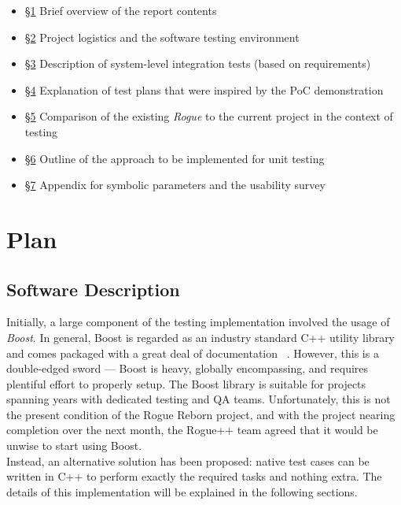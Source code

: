 \documentclass[12pt, titlepage]{article}
\begin{document}
		\begin{itemize}
			\item [] \hyperref[section1]{\S 1} Brief overview of the report contents
			\item [] \hyperref[section2]{\S 2} Project logistics and the software testing environment
			\item [] \hyperref[section3]{\S 3} Description of system-level integration tests (based on requirements)
			\item [] \hyperref[section4]{\S 4} Explanation of test plans that were inspired by the PoC demonstration
			\item [] \hyperref[section5]{\S 5} Comparison of the existing \textit{Rogue} to the current project in the context of testing
			\item [] \hyperref[section6]{\S 6} Outline of the approach to be implemented for unit testing  
			\item [] \hyperref[section7]{\S 7} Appendix for symbolic parameters and the usability survey
		\end{itemize}

\newpage
\section{Plan}
\label{section2}
		
	\subsection{Software Description}

	Initially, a large component of the testing implementation involved the usage of \textit{Boost}.  In general, Boost is regarded as an industry standard C++ utility library and comes packaged with a great deal of documentation ~\citep{BoostHome}.  However, this is a double-edged sword --- Boost is heavy, globally encompassing, and requires plentiful effort to properly setup.  The Boost library is suitable for projects spanning years with dedicated testing and QA teams.  Unfortunately, this is not the present condition of the Rogue Reborn project, and with the project nearing completion over the next month, the Rogue++ team agreed that it would be unwise to start using Boost.\\

	Instead, an alternative solution has been proposed: native test cases can be written in C++ to perform exactly the required tasks and nothing extra.  The details of this implementation will be explained in the following sections.
\end{document}
